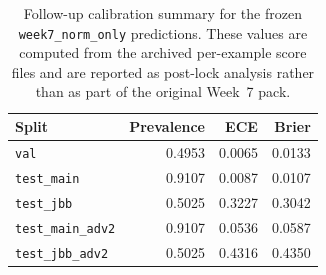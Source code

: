 \begin{table}[t]
\centering
\caption{Follow-up calibration summary for the frozen \texttt{week7\_norm\_only} predictions. These values are computed from the archived per-example score files and are reported as post-lock analysis rather than as part of the original Week~7 pack.}
\label{tab:followup_calibration}
\small
\begin{tabular}{lrrr}
\toprule
Split & Prevalence & ECE & Brier \\
\midrule
\texttt{val} & 0.4953 & 0.0065 & 0.0133 \\
\texttt{test\_main} & 0.9107 & 0.0087 & 0.0107 \\
\texttt{test\_jbb} & 0.5025 & 0.3227 & 0.3042 \\
\texttt{test\_main\_adv2} & 0.9107 & 0.0536 & 0.0587 \\
\texttt{test\_jbb\_adv2} & 0.5025 & 0.4316 & 0.4350 \\
\bottomrule
\end{tabular}
\normalsize
\end{table}

